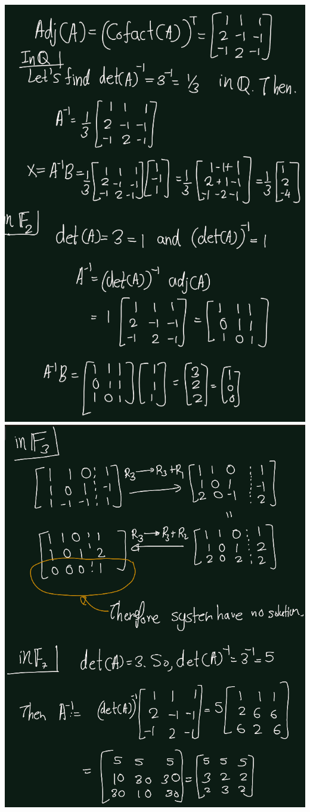\documentclass[
]{book}
\theoremstyle{definition}
\theoremstyle{definition}
\theoremstyle{definition}
\theoremstyle{definition}
\theoremstyle{remark}
\begin{document}
\includegraphics{figures/ch_3/ex-1.6-3.png}
\includegraphics{figures/ch_3/ex-1.6-4.png}
\end{document}
